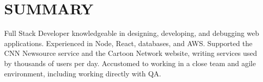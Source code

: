 \documentclass[]{deedy-resume-openfont}
\begin{document}
%
%

%
%



\vspace{5mm}

%
%

\section{SUMMARY}
\begin{flushleft}
Full Stack Developer knowledgeable in designing, developing, and debugging web applications. Experienced in Node, React, databases, and AWS. Supported the CNN Newsource service and the Cartoon Network website, writing services used by thousands of users per day. Accustomed to working in a close team and agile environment, including working directly with QA.
\end{flushleft}
\vspace*{-3mm}
\end{document}
